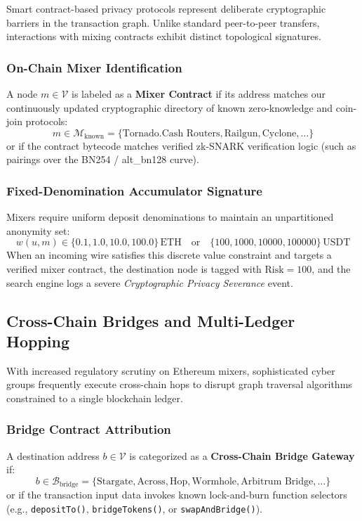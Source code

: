 Smart contract-based privacy protocols represent deliberate cryptographic barriers in the transaction graph. Unlike standard peer-to-peer transfers, interactions with mixing contracts exhibit distinct topological signatures.

\subsubsection{On-Chain Mixer Identification}
A node $m \in \mathcal{V}$ is labeled as a \textbf{Mixer Contract} if its address matches our continuously updated cryptographic directory of known zero-knowledge and coin-join protocols:
\begin{equation}
    m \in \mathcal{M}_{\text{known}} = \{\text{Tornado.Cash Routers}, \text{Railgun}, \text{Cyclone}, \dots\}
\end{equation}
or if the contract bytecode matches verified zk-SNARK verification logic (such as pairings over the BN254 / alt\_bn128 curve).

\subsubsection{Fixed-Denomination Accumulator Signature}
Mixers require uniform deposit denominations to maintain an unpartitioned anonymity set:
\begin{equation}
    w(u, m) \in \{0.1, 1.0, 10.0, 100.0\}\,\text{ETH} \quad \text{or} \quad \{100, 1000, 10000, 100000\}\,\text{USDT}
\end{equation}
When an incoming wire satisfies this discrete value constraint and targets a verified mixer contract, the destination node is tagged with $\text{Risk} = 100$, and the search engine logs a severe \emph{Cryptographic Privacy Severance} event.

\subsection{Cross-Chain Bridges and Multi-Ledger Hopping}

With increased regulatory scrutiny on Ethereum mixers, sophisticated cyber groups frequently execute cross-chain hops to disrupt graph traversal algorithms constrained to a single blockchain ledger.

\subsubsection{Bridge Contract Attribution}
A destination address $b \in \mathcal{V}$ is categorized as a \textbf{Cross-Chain Bridge Gateway} if:
\begin{equation}
    b \in \mathcal{B}_{\text{bridge}} = \{\text{Stargate}, \text{Across}, \text{Hop}, \text{Wormhole}, \text{Arbitrum Bridge}, \dots\}
\end{equation}
or if the transaction input data invokes known lock-and-burn function selectors (e.g., \texttt{depositTo()}, \texttt{bridgeTokens()}, or \texttt{swapAndBridge()}).

